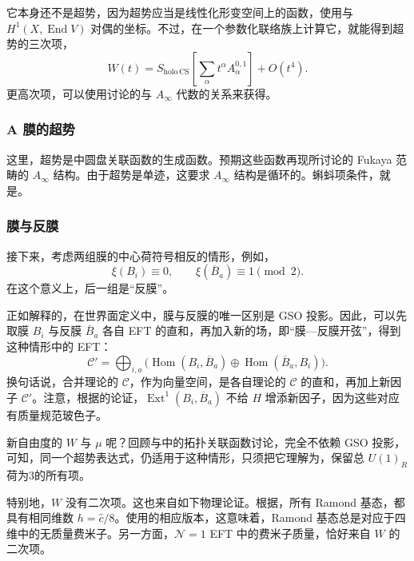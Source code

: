 它本身还不是超势，因为超势应当是线性化形变空间上的函数，使用与 $H^1(X,\operatorname{End}V)$ 对偶的坐标。不过，在一个参数化联络族上计算它，就能得到超势的三次项，
\[
W(t)=S_{\mathrm{holo\,CS}}\!\left[\sum_\alpha t^\alpha A_\alpha^{0,1}\right]+O(t^4).
\]
更高次项，可以使用讨论的与 $A_\infty$ 代数的关系来获得。

\subsubsection{A 膜的超势}\label{sec:5.4.3.5}

这里，超势是中圆盘关联函数的生成函数。预期这些函数再现所讨论的 Fukaya 范畴的 $A_\infty$ 结构。由于超势是单迹，这要求 $A_\infty$ 结构是循环的。蝌蚪项条件，就是。

\subsubsection{膜与反膜}\label{sec:5.4.3.6}

接下来，考虑两组膜的中心荷符号相反的情形，例如，
\[
\xi(B_i)\equiv0,\qquad \xi(\overline B_a)\equiv1\pmod2.
\]
在这个意义上，后一组是“反膜”。

正如解释的，在世界面定义中，膜与反膜的唯一区别是 GSO 投影。因此，可以先取膜 $B_i$ 与反膜 $\overline B_a$ 各自 EFT 的直和，再加入新的场，即“膜—反膜开弦”，得到这种情形中的 EFT：
\[
\mathcal{C}'=\bigoplus_{i,a}\bigl(
\operatorname{Hom}(B_i,\overline B_a)
\oplus\operatorname{Hom}(\overline B_a,B_i)\bigr).
\]
换句话说，合并理论的 $\mathcal{C}$，作为向量空间，是各自理论的 $\mathcal{C}$ 的直和，再加上新因子 $\mathcal{C}'$。注意，根据的论证，$\operatorname{Ext}^1(B_i,\overline B_a)$ 不给 $H$ 增添新因子，因为这些对应有质量规范玻色子。

新自由度的 $W$ 与 $\mu$ 呢？回顾与中的拓扑关联函数讨论，完全不依赖 GSO 投影，可知，同一个超势表达式，仍适用于这种情形，只须把它理解为，保留总 $U(1)_R$ 荷为3的所有项。

特别地，$W$ 没有二次项。这也来自如下物理论证。根据，所有 Ramond 基态，都具有相同维数 $h=\hat c/8$。使用的相应版本，这意味着，Ramond 基态总是对应于四维中的无质量费米子。另一方面，$\mathcal{N}=1$ EFT 中的费米子质量，恰好来自 $W$ 的二次项。

